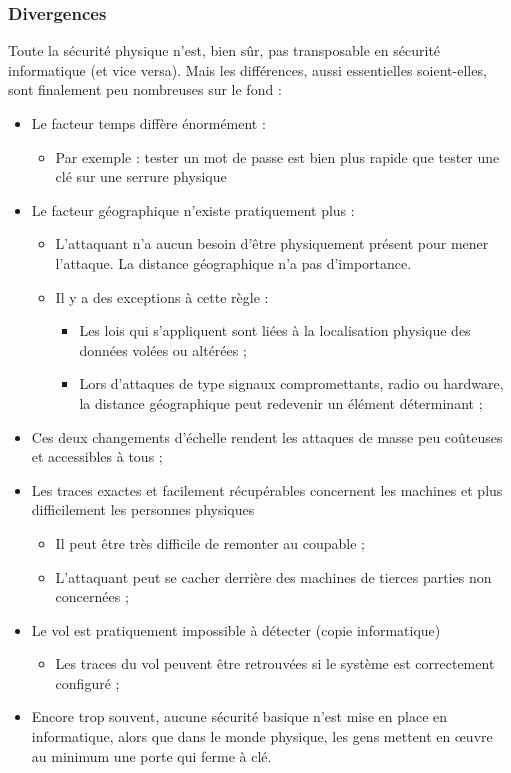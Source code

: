 \documentclass[11pt]{article} %
\begin{document}
\subsubsection{Divergences}

Toute la sécurité physique n'est, bien sûr, pas transposable en sécurité
informatique (et vice versa). Mais les différences, aussi essentielles
soient-elles, sont finalement peu nombreuses sur le fond :
\begin{itemize}
\item	Le facteur temps diffère énormément : 
\begin{itemize}
\item Par exemple : tester un mot de passe est bien plus rapide que tester une
clé sur une serrure physique
\end{itemize}
\item Le facteur géographique n'existe pratiquement plus :
	\begin{itemize}
\item L'attaquant n'a aucun besoin d'être physiquement présent pour mener
l'attaque. La distance géographique n'a pas d'importance.
	\item	Il y a des exceptions à cette règle : 
		\begin{itemize}
\item Les lois qui s'appliquent sont liées à la localisation physique des
données volées ou altérées ;
\item Lors d'attaques de type signaux compromettants, radio ou hardware, la
distance géographique peut redevenir un élément déterminant ;
		\end{itemize}
	\end{itemize}
\item Ces deux changements d'échelle rendent les attaques de masse peu coûteuses
et accessibles à tous ;
\item Les traces exactes et facilement récupérables concernent les machines et
plus difficilement les personnes physiques
	\begin{itemize}
	\item	Il peut être très difficile de remonter au coupable ;
\item L'attaquant peut se cacher derrière des machines de tierces parties non
concernées ;
	\end{itemize}
\item	Le vol est pratiquement impossible à détecter (copie informatique)
	\begin{itemize}
\item Les traces du vol peuvent être retrouvées si le système est correctement
configuré ;
	\end{itemize}
\item Encore trop souvent, aucune sécurité basique n'est mise en place en
informatique, alors que dans le monde physique, les gens mettent en œuvre au
minimum une porte qui ferme à clé.
\end{itemize}
\end{document}
